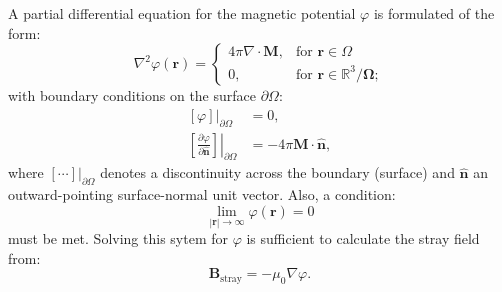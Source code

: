 A partial differential equation for the magnetic potential $\varphi$ is formulated of the form:
\begin{equation}\label{potential}
\nabla^2 \varphi(\boldsymbol{r}) =
\begin{cases}
4\pi\nabla \cdot \boldsymbol{M}, & \text{for }\boldsymbol{r} \in \Omega \\
0,                           & \text{for }\boldsymbol{r} \in \mathbb{R}^3 / \boldsymbol{\Omega};
\end{cases}
\end{equation}
with boundary conditions on the surface $\partial \Omega$:
\begin{align}\label{boundaries1}
\left. \left[ \varphi \right]\right|_{\partial \Omega} &= 0, \\
\left. \left[ \frac{\partial \varphi}{\partial \boldsymbol{\hat{n}}} \right]\right|_{\partial \Omega} &= -4\pi \boldsymbol{M} \cdot \boldsymbol{\hat{n}}, \label{boundaries2}
\end{align}
where $\left. \left[\cdots \right]\right|_{\partial \Omega}$ denotes a discontinuity across the boundary (surface) and $\boldsymbol{\hat{n}}$ an outward-pointing surface-normal unit vector. Also, a condition:
\begin{equation}\label{boundary}
\lim_{|\boldsymbol{r}| \to \infty} \varphi(\boldsymbol{r}) = 0
\end{equation}
must be met. Solving this sytem for $\varphi$ is sufficient to calculate the stray field from:
\begin{equation}
\boldsymbol{B}_\text{stray} = -\mu_0 \nabla \varphi.
\end{equation}\par

